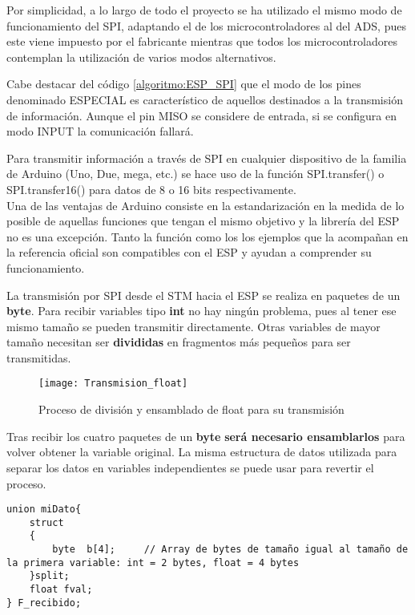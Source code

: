 Por simplicidad, a lo largo de todo el proyecto se ha utilizado el mismo modo de funcionamiento del SPI, adaptando el de los microcontroladores al del ADS, pues este viene impuesto por el fabricante mientras que todos los microcontroladores contemplan la utilización de varios modos alternativos.

Cabe destacar del código \ref{algoritmo:ESP_SPI} que el modo de los pines denominado \textsc{ESPECIAL} es característico de aquellos destinados a la transmisión de información. Aunque el pin MISO se considere de entrada, si se configura en modo INPUT la comunicación fallará.

Para transmitir información a través de SPI en cualquier dispositivo de la familia de Arduino (Uno, Due, mega, etc.) se hace uso de la función SPI.transfer() o SPI.transfer16() para datos de 8 o 16 bits respectivamente. \\
Una de las ventajas de Arduino consiste en la estandarización en la medida de lo posible de aquellas funciones que tengan el mismo objetivo y la librería del ESP no es una excepción. Tanto la función como los los ejemplos que la acompañan en la referencia oficial son compatibles con el ESP y ayudan a comprender su funcionamiento.

\clearpage

La transmisión por SPI desde el STM hacia el ESP se realiza en paquetes de un \textbf{byte}. Para recibir variables tipo \textbf{int} no hay ningún problema, pues al tener ese mismo tamaño se pueden transmitir directamente. Otras variables de mayor tamaño necesitan ser \textbf{divididas} en fragmentos más pequeños para ser transmitidas.

\begin{figure} [h]
    \centering
    \texttt{[image: Transmision\_float]}
    \caption{Proceso de división y ensamblado de float para su transmisión}
    \label{fig:Transmision_float}
\end{figure}

Tras recibir los cuatro paquetes de un \textbf{byte} \textbf{será necesario ensamblarlos} para volver obtener la variable original. La misma estructura de datos utilizada para separar los datos en variables independientes se puede usar para revertir el proceso.

\begin{lstlisting}[label=algoritmo:ESP_split_var,style = STM-code,frame=single,caption=Variables y tipos de dato específicos]
union miDato{
 	struct
	{
		byte  b[4];     // Array de bytes de tamaño igual al tamaño de la primera variable: int = 2 bytes, float = 4 bytes
	}split;
	float fval;
} F_recibido; 
\end{lstlisting}

